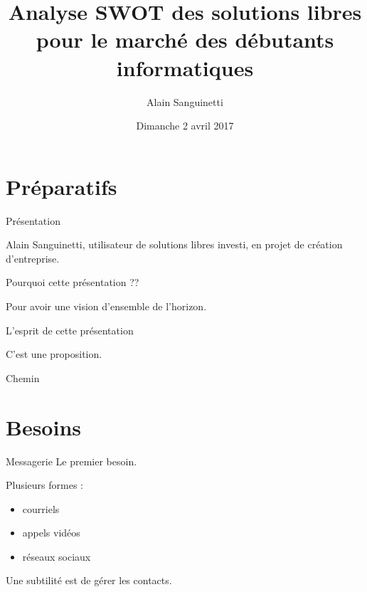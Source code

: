 \documentclass[xcolor=svgnames]{beamer}
\title
  [\hspace{2em}]
  {Analyse SWOT des solutions libres pour le marché des débutants informatiques}
\author
  [A.S.]
  {Alain Sanguinetti}
\date
  {Dimanche 2 avril 2017}
\institute
  {}
\begin{document}
\maketitle

\section
    {Préparatifs}
    
    \begin{frame}{Présentation}
    
        Alain Sanguinetti, \pause
        utilisateur de solutions libres investi, \pause
        en projet de création d’entreprise.
        
    \end{frame}
    
    \begin{frame}{Pourquoi cette présentation ??}
    
        Pour avoir une vision d’ensemble de l’horizon.        
        
    \end{frame}
    
    \begin{frame}{L’esprit de cette présentation}
    
        C’est une proposition. 
        
    \end{frame}
    
    \begin{frame}{Chemin}
    
        \tableofcontents
    
    \end{frame}
    
    
    

\section{Besoins}

    \begin{frame}{Messagerie}
        Le premier besoin. \pause
        
        Plusieurs formes : 
        
        \begin{itemize}
            \item courriels
            \item appels vidéos
            \item réseaux sociaux
        \end{itemize} \pause
        
        Une subtilité est de gérer les contacts.
        
    \end{frame}
\end{document}
